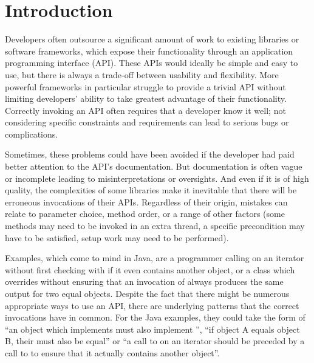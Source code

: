 \chapter{Introduction}\label{ch:intro}

Developers often outsource a significant amount of work to existing libraries or software frameworks, which expose their functionality through an application programming interface (API).
These APIs would ideally be simple and easy to use, but there is always a trade-off between usability and flexibility.
More powerful frameworks in particular struggle to provide a trivial API without limiting developers' ability to take greatest advantage of their functionality.
Correctly invoking an API often requires that a developer know it well;
not considering specific constraints and requirements can lead to serious bugs or complications.

Sometimes, these problems could have been avoided if the developer had paid better attention to the API's documentation.
But documentation is often vague or incomplete leading to misinterpretations or oversights.
And even if it is of high quality, the complexities of some libraries make it inevitable that there will be erroneous invocations of their APIs.
Regardless of their origin, mistakes can relate to parameter choice, method order, or a range of other factors (some methods may need to be invoked in an extra thread, a specific precondition may have to be satisfied, setup work may need to be performed).

Examples, which come to mind in Java, are a programmer calling  on an iterator without first checking with  if it even contains another object, or a class which overrides  without ensuring that an invocation of  always produces the same output for two equal objects.
Despite the fact that there might be numerous appropriate ways to use an API, there are underlying patterns that the correct invocations have in common.
For the Java examples, they could take the form of ``an object which implements  must also implement '', ``if object A equals object B, their  must also be equal'' or ``a call to  on an iterator should be preceded by a call to  to ensure that it actually contains another object''.


